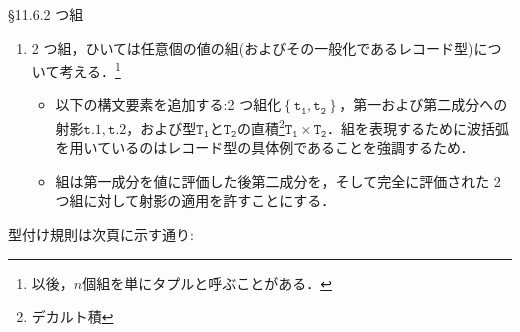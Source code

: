 \documentclass[9pt]{beamer}
\begin{document}
\begin{frame}{\S11.6.2 つ組}
\begin{enumerate}
\item 2 つ組，ひいては任意個の値の組(およびその一般化であるレコード型)について考える．\footnote{以後，$n$個組を単にタプルと呼ぶことがある．}\begin{itemize}
\item 以下の構文要素を追加する:2 つ組化$\left\{\mathtt{t_{1},t_{2}}\right\}$，第一および第二成分への射影$\mathtt{t.1, t.2}$，および型$\mathtt{T_{1}}$と$\mathtt{T_{2}}$の直積\footnote{デカルト積}$\mathtt{T_{1}\times T_{2}}$．組を表現するために波括弧を用いているのはレコード型の具体例であることを強調するため．
\item 組は第一成分を値に評価した後第二成分を，そして完全に評価された 2 つ組に対して射影の適用を許すことにする．
\end{itemize}
\end{enumerate}
型付け規則は次頁に示す通り:
\end{frame}
\end{document}
